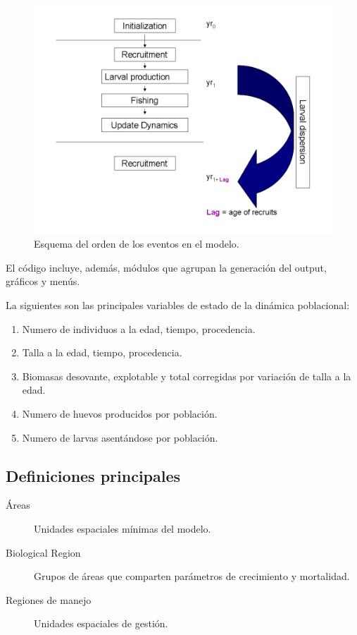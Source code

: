 \documentclass[12pt, oneside, a4paper]{article}
\begin{document}
			\begin{figure}[htb]
				\begin{center}
					\includegraphics[width=\textwidth]{MetapescaDinamics.png}
					\caption{Esquema del orden de los eventos en el modelo.}
					\label{fig:Esquema general}
				\end{center}
			\end{figure}	
		
		El código incluye, además, módulos que agrupan la generación del output, gráficos y menús. 

		La siguientes son las principales variables de estado de la dinámica poblacional:
		\begin{enumerate}
			\item Numero de individuos a la edad, tiempo, procedencia.
			\item Talla a la edad, tiempo, procedencia.
			\item Biomasas desovante, explotable y total corregidas por variación de talla a la edad.
			\item Numero de huevos producidos por población.
			\item Numero de larvas asentándose por población.
		\end{enumerate}
 
 
		\subsection{Definiciones principales}
		
		\begin{description}
		\item[Áreas] Unidades espaciales mínimas del modelo.
		\item[Biological Region] Grupos de áreas que comparten parámetros de crecimiento y mortalidad. 
		\item[Regiones de manejo] Unidades espaciales de gestión. 		
		\end{description}
\end{document}
